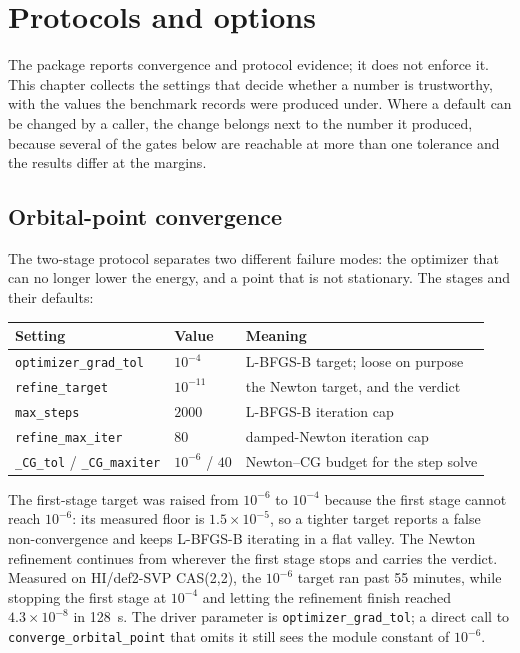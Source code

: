 \chapter{Protocols and options}
\label{ch:protocols}

The package reports convergence and protocol evidence; it does not
enforce it.  This chapter collects the settings that decide whether a
number is trustworthy, with the values the benchmark records were
produced under.  Where a default can be changed by a caller, the
change belongs next to the number it produced, because several of the
gates below are reachable at more than one tolerance and the results
differ at the margins.

\section{Orbital-point convergence}

The two-stage protocol separates two different failure modes: the
optimizer that can no longer lower the energy, and a point that is not
stationary.  The stages and their defaults:

\begin{center}
\begin{tabular}{lll}
\toprule
Setting & Value & Meaning \\
\midrule
\texttt{optimizer\_grad\_tol} & $10^{-4}$ & L-BFGS-B target; loose on purpose \\
\texttt{refine\_target} & $10^{-11}$ & the Newton target, and the verdict \\
\texttt{max\_steps} & $2000$ & L-BFGS-B iteration cap \\
\texttt{refine\_max\_iter} & $80$ & damped-Newton iteration cap \\
\texttt{\_CG\_tol} / \texttt{\_CG\_maxiter} & $10^{-6}$ / $40$ & Newton--CG budget for the step solve \\
\bottomrule
\end{tabular}
\end{center}

The first-stage target was raised from $10^{-6}$ to $10^{-4}$ because
the first stage cannot reach $10^{-6}$: its measured floor is
$1.5\times10^{-5}$, so a tighter target reports a false
non-convergence and keeps L-BFGS-B iterating in a flat valley.  The
Newton refinement continues from wherever the first stage stops and
carries the verdict.  Measured on HI/def2-SVP CAS(2,2), the
$10^{-6}$ target ran past 55 minutes, while stopping the first stage
at $10^{-4}$ and letting the refinement finish reached
$4.3\times10^{-8}$ in 128~s.  The driver parameter is
\texttt{optimizer\_grad\_tol}; a direct call to
\texttt{converge\_orbital\_point} that omits it still sees the module
constant of $10^{-6}$.

